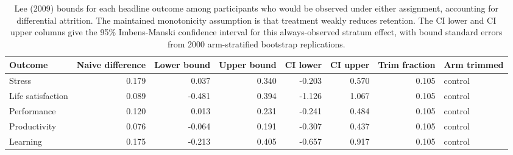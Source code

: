 \begin{table}

\caption{\label{tab:lee-bounds}Lee (2009) bounds for each headline outcome among participants who would be observed under either assignment, accounting for differential attrition. The maintained monotonicity assumption is that treatment weakly reduces retention. The CI lower and CI upper columns give the 95\% Imbens-Manski confidence interval for this always-observed stratum effect, with bound standard errors from 2000 arm-stratified bootstrap replications.}
\centering
\begin{tabular}[t]{lrrrrrrl}
\toprule
Outcome & Naive difference & Lower bound & Upper bound & CI lower & CI upper & Trim fraction & Arm trimmed\\
\midrule
Stress & 0.179 & 0.037 & 0.340 & -0.203 & 0.570 & 0.105 & control\\
Life satisfaction & 0.089 & -0.481 & 0.394 & -1.126 & 1.067 & 0.105 & control\\
Performance & 0.120 & 0.013 & 0.231 & -0.241 & 0.484 & 0.105 & control\\
Productivity & 0.076 & -0.064 & 0.191 & -0.307 & 0.437 & 0.105 & control\\
Learning & 0.175 & -0.213 & 0.405 & -0.657 & 0.917 & 0.105 & control\\
\bottomrule
\end{tabular}
\end{table}
